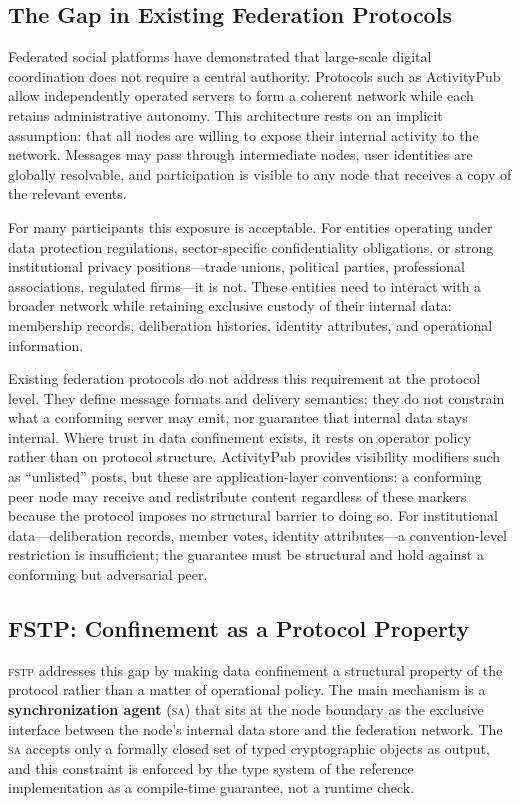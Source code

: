 \documentclass[12pt]{article}
\newcommand{\SA}{\textsc{sa}}
\newcommand{\FSTP}{\textsc{fstp}}
\begin{document}
	\subsection{The Gap in Existing Federation Protocols}
	
	Federated social platforms have demonstrated that large-scale digital
	coordination does not require a central authority. Protocols such as
	ActivityPub~\cite{w3c2018activitypub} allow independently operated
	servers to form a coherent network while each retains administrative
	autonomy. This architecture rests on an implicit assumption: that all
	nodes are willing to expose their internal activity to the network.
	Messages may pass through intermediate nodes, user identities are
	globally resolvable, and participation is visible to any node that
	receives a copy of the relevant events.
	
	For many participants this exposure is acceptable. For entities
	operating under data protection regulations, sector-specific
	confidentiality obligations, or strong institutional privacy
	positions---trade unions, political parties, professional associations,
	regulated firms---it is not. These entities need to interact with a
	broader network while retaining exclusive custody of their internal
	data: membership records, deliberation histories, identity attributes,
	and operational information.
	
	Existing federation protocols do not address this requirement at the
	protocol level. They define message formats and delivery semantics;
	they do not constrain what a conforming server may emit, nor guarantee
	that internal data stays internal. Where trust in data confinement
	exists, it rests on operator policy rather than on protocol structure.
	ActivityPub provides visibility modifiers such as ``unlisted'' posts,
	but these are application-layer conventions: a conforming peer node
	may receive and redistribute content regardless of these markers
	because the protocol imposes no structural barrier to doing so. For
	institutional data---deliberation records, member votes, identity
	attributes---a convention-level restriction is insufficient; the
	guarantee must be structural and hold against a conforming but
	adversarial peer.
	
	\subsection{FSTP: Confinement as a Protocol Property}
	
	\FSTP{} addresses this gap by making data confinement a structural
	property of the protocol rather than a matter of operational policy.
	The main mechanism is a \textbf{synchronization agent} (\SA{}) that
	sits at the node boundary as the exclusive interface between the
	node's internal data store and the federation network. The \SA{}
	accepts only a formally closed set of typed cryptographic objects as
	output, and this constraint is enforced by the type system of the
	reference implementation as a compile-time guarantee, not a runtime
	check.
	
\end{document}
